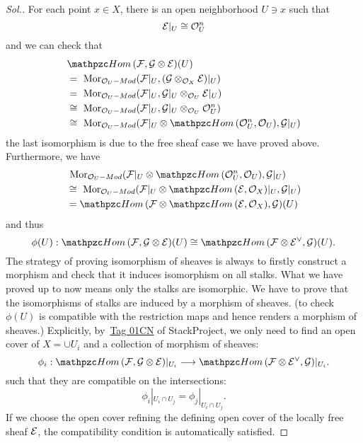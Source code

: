 \documentclass[11pt]{book} %
\begin{document}
\begin{proof}[Sol.]
For each point $x\in X$, there is an open neighborhood  $U\ni x$ such that 
$$
{\cal E}|_U\cong {\cal O}_U^n
$$
and we can check that
$$
\begin{aligned}
&\phom(\calf,\calg\otimes\cale)(U)\\
&=\mor_{\calo_U-Mod}(\calf|_U,(\calg\otimes_{\calo_X}\cale)|_U)\\
&=\mor_{\calo_U-Mod}(\calf|_U,\calg|_U\otimes_{\calo_U}\cale|_U)\\
&\cong \mor_{\calo_U-Mod}(\calf|_U,\calg|_U\otimes_{\calo_U}\calo_U^n)\\
&\cong \mor_{\calo_U-Mod}(\calf|_U\otimes\phom(\calo_U^n,\calo_U),\calg|_U)\\
\end{aligned}
$$
the last isomorphism is due to the free sheaf case we have proved above. 
Furthermore, we have
$$
\begin{aligned}
&\mor_{\calo_U-Mod}(\calf|_U\otimes\phom(\calo_U^n,\calo_U),\calg|_U)\\
&\cong \mor_{\calo_U-Mod}(\calf|_U\otimes\phom(\cale,\calo_X)|_U,\calg|_U)\\
&=\phom(\calf\otimes\phom(\cale,\calo_X),\calg)(U)
\end{aligned}
$$
and thus
$$
\phi(U):\phom(\calf,\calg\otimes\cale)(U)\cong\phom(\calf\otimes\cale^\vee,\calg)(U).
$$
The strategy of proving isomorphism of sheaves is always to firstly construct a morphism and check that it induces isomorphism on all stalks. What we have proved up to now means only the stalks are isomorphic. We have to prove that the isomorphisms of stalks are induced by a morphism of sheaves. (to check $\phi(U)$ is compatible with the restriction maps and hence renders a morphism of sheaves.) Explicitly, by~\href{http://stacks.math.columbia.edu/tag/01CN}{Tag 01CN} of StackProject, we only need to find an open cover of $X=\cup U_i$ and a collection of morphism of sheaves:
$$
\phi_i:\phom(\calf,\calg\otimes\cale)|_{U_i}\lrta \phom(\calf\otimes\cale^\vee,\calg)|_{U_i}.
$$
such that they are compatible on the intersections:
$$
\phi_i|_{U_i\cap U_j}=\phi_j|_{U_i\cap U_j}.
$$
If we choose the open cover refining the defining open cover of the locally free sheaf ${\cal E}$, the compatibility condition is automatically satisfied.
\end{proof}
\end{document}
